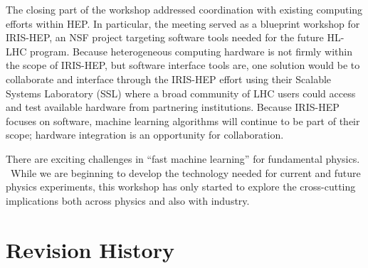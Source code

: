 \documentclass[11pt,letterpaper,fleqn]{article}
\begin{document}

The closing part of the workshop addressed coordination with existing computing efforts within HEP. In particular, the meeting served as a blueprint workshop for IRIS-HEP, an NSF project targeting software tools needed for the future HL-LHC program. Because heterogeneous computing hardware is not firmly within the scope of IRIS-HEP, but software interface tools are, one solution would be to collaborate and interface through the IRIS-HEP effort using their Scalable Systems Laboratory (SSL) where a broad community of LHC users could access and test available hardware from partnering institutions.  Because IRIS-HEP focuses on software, machine learning algorithms will continue to be part of their scope; hardware integration is an opportunity for collaboration.

There are exciting challenges in ``fast machine learning'' for fundamental physics.  While we are beginning to develop the technology needed for current and future physics experiments, this workshop has only started to explore the cross-cutting implications both across physics and also with industry.



\appendix
\newpage
\section{Revision History}
\end{document}
